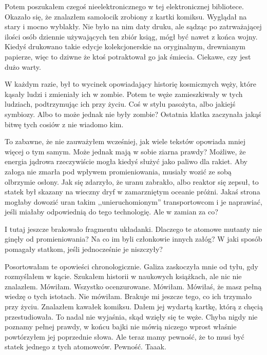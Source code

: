 Potem poszukałem czegoś nieelektronicznego w tej elektronicznej bibliotece.
Okazało się, że znalazłem samolocik zrobiony z kartki komiksu.
Wyglądał na stary i mocno wyblakły. Nie było na nim daty druku, ale sądząc po zatrważającej ilości osób dziennie używających ten zbiór ksiąg, mógł być nawet z końca wojny.
Kiedyś drukowano takie edycje kolekcjonerskie na oryginalnym, drewnianym papierze, więc to dziwne że ktoś potraktował go jak śmiecia.
Ciekawe, czy jest dużo warty.

W każdym razie, był to wycinek opowiadający historię kosmicznych węży, które kąsały ludzi i zmieniały ich w zombie.
Potem te węże zamieszkiwały w tych ludziach, podtrzymując ich przy życiu. Coś w stylu pasożyta, albo jakiejś symbiozy.
Albo to może jednak nie były zombie? 
Ostatnia klatka zaczynała jakąś bitwę tych cosiów z nie wiadomo kim.

To zabawne, że nie zauważyłem wcześniej, jak wiele tekstów  opowiada mniej więcej o tym samym. 
Może jednak mają w sobie ziarna prawdy?
Możliwe, że energia jądrowa rzeczywiście mogła kiedyś służyć jako paliwo dla rakiet.
Aby załoga nie zmarła pod wpływem promieniowania, musiały wozić ze sobą olbrzymie osłony.
Jak się zdarzyło, że uranu zabrakło, albo reaktor się zepsuł, to statek był skazany na wieczny dryf w zamarzniętym oceanie próżni.
Jakaś strona mogłaby dowozić uran takim ,,unieruchomionym'' transportowcom i je naprawiać, jeśli miałaby odpowiednią do tego technologię.
Ale w zamian za co?

I tutaj jeszcze brakowało fragmentu układanki. Dlaczego te atomowe mutanty nie ginęły od promieniowania? Na co im byli członkowie innych załóg?
W jaki sposób pomagały statkom, jeśli jednocześnie je niszczyły?

\begin{dialogue}
	\ds{} Posortowałam te opowieści chronologicznie. \dm{} Galiza zaskoczyła mnie od tyłu, gdy rozmyślałem w kącie.
	\ds{} Szukałem historii w naukowych książkach, ale nic nie znalazłem.
	\ds{} Mówiłam.
	\ds{} Wszystko ocenzurowane.
	\ds{} Mówiłam.
	\ds{} Mówiłaś, że masz pełną wiedzę o tych istotach.
	\ds{} Nie mówiłam. Brakuje mi jeszcze tego, co ich trzymało przy życiu.
	\ds{} Znalazłem kawałek komiksu. \dm{} Dałem jej wydartą kartkę, którą z chęcią przestudiowała.
	\ds{} To nadal nie wyjaśnia, skąd wzięły się te węże.
	\ds{} Chyba nigdy nie poznamy pełnej prawdy, w końcu bajki nie mówią niczego wprost \dm{} właśnie powtórzyłem jej poprzednie słowa.
	\ds{} Ale teraz mamy pewność, że to musi być statek jednego z tych atomowców.
	\ds{} Pewność. Taaak.
\end{dialogue}

